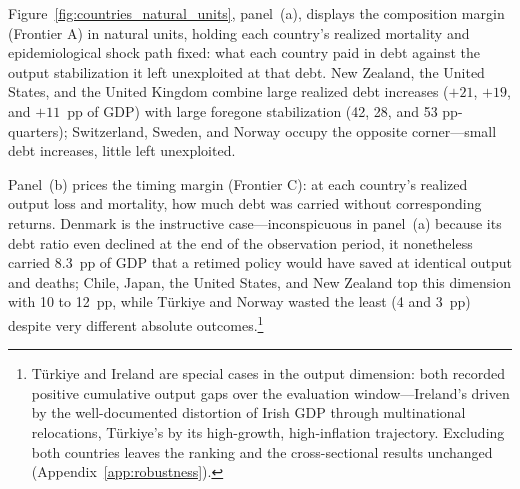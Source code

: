 \documentclass[12pt, a4paper]{article}
\begin{document}
Figure~\ref{fig:countries_natural_units}, panel~(a), displays the composition margin (Frontier A) in natural units, holding each country's realized mortality and epidemiological shock path fixed: what each country paid in debt against the output stabilization it left unexploited at that debt. New Zealand, the United States, and the United Kingdom combine large realized debt increases (\(+21\), \(+19\), and \(+11\)~pp of GDP) with large foregone stabilization (42, 28, and 53 pp-quarters); Switzerland, Sweden, and Norway occupy the opposite corner---small debt increases, little left unexploited.

Panel~(b) prices the timing margin (Frontier C): at each country's realized output loss and mortality, how much debt was carried without corresponding returns. Denmark is the instructive case---inconspicuous in panel~(a) because its debt ratio even declined at the end of the observation period, it nonetheless carried 8.3~pp of GDP that a retimed policy would have saved at identical output and deaths; Chile, Japan, the United States, and New Zealand top this dimension with 10 to 12~pp, while T\"urkiye and Norway wasted the least (4 and 3~pp) despite very different absolute outcomes.\footnote{T\"urkiye and Ireland are special cases in the output dimension:
both recorded positive cumulative output gaps over the evaluation
window---Ireland's driven by the well-documented distortion of Irish GDP
through multinational relocations, T\"urkiye's by its high-growth,
high-inflation trajectory. Excluding both countries leaves the
ranking and the cross-sectional results unchanged
(Appendix~\ref{app:robustness}).}
\end{document}
